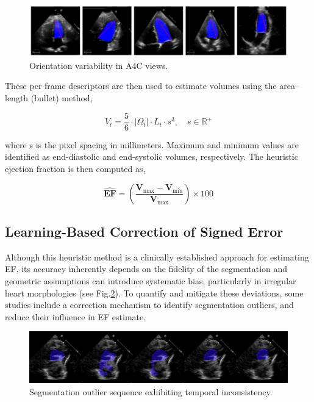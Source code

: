 \documentclass[runningheads]{llncs}
\begin{document}
\begin{figure}
    \centering
    \includegraphics[width=0.9\linewidth]{orientation-var.png}
    \caption{Orientation variability in A4C views.}
    \label{fig:samples}
\end{figure}

These per frame descriptors are then used to estimate volumes using the area–length (bullet) method,

\begin{equation}
V_t = \frac{5}{6} \cdot |\Omega_t| \cdot L_t \cdot s^3, \quad s \in \mathbb{R}^+
\end{equation}

\noindent
where s is the pixel spacing in millimeters. Maximum and minimum values are identified as end-diastolic and end-systolic volumes, respectively. The heuristic ejection fraction is then computed as,

\begin{equation}
\widehat{\mathbf{EF}} = \left( \frac{\mathbf{V}_{\text{max}} - \mathbf{V}_{\text{min}}}{\mathbf{V}_{\text{max}}} \right) \times 100
\end{equation}

\subsection{Learning-Based Correction of Signed Error}

Although this heuristic method is a clinically established approach for estimating EF, its accuracy inherently depends on the fidelity of the segmentation and geometric assumptions can introduce systematic bias, particularly in irregular heart morphologies (see Fig.\ref{fig:segmentation-sequence}). To quantify and mitigate these deviations, some studies include a correction mechanism to identify segmentation outliers, and reduce their influence in EF estimate\cite{zhang2024automated}.

\begin{figure}
    \centering
    \includegraphics[width=0.9\linewidth]{segmentation_outlier.png}
    \caption{Segmentation outlier sequence exhibiting temporal inconsistency.}
    \label{fig:segmentation-sequence}
\end{figure}
\end{document}
